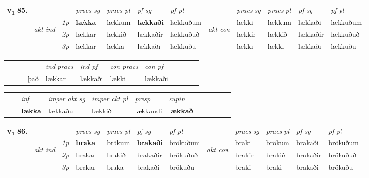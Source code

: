 \begin{tabular}{llllllllllll} \toprule
\multirow{4}{*}{{{\textbf{v{\textsubscript{1}}} \Large{\textbf{85.}}}}}  & &   &  \textit{praes sg}  & \textit{praes pl}  &\textit{ pf sg} & \textit{pf pl} &  &  \textit{praes sg}  & \textit{praes pl}  & \textit{pf sg} & \textit{pf pl } \\*
	\cmidrule{4-7} \cmidrule{9-12}
 & \multirow{3}{*}{\begin{turn}{90}\textit{akt ind}\end{turn}} & {\textit{1p}} & \textbf{lækka} & lækkum    & \textbf{lækkaði} & lækkuðum & \multirow{3}{*}{\begin{turn}{90}\textit{akt con}\end{turn}} &lækki & lækkum & lækkaði & lækkuðum\\*
& &  {\textit{2p}} &  lækkar  & lækkið   & lækkaðir & lækkuðuð & & lækkir & lækkið & lækkaðir & lækkuðuð \\*
& &  {\textit{3p}} & lækkar & lækka   & lækkaði & lækkuðu & & lækki & lækki& lækkaði & lækkuðu  \\*
\cmidrule{4-7} \cmidrule{9-12}
\end{tabular}


\begin{tabular}{llllllllllll}
 & &  & &  \textit{ind praes} & \textit{ind pf} & \textit{con praes} & \textit{con pf} \\*
&  & & það & lækkar & lækkaði & lækki & lækkaði \\*
\cmidrule{5-9}
\end{tabular}


\begin{tabular}{llllllllllll}
 & & \textit{inf} & \textit{imper akt sg} & \textit{imper akt pl}   & \textit{presp} & \textit{supin}       \\*
  & & \textbf{lækka} & lækkaðu  & lækkið   & lækkandi &  \textbf{lækkað}   \\*
\cmidrule{1-12}
\end{tabular}



\begin{tabular}{llllllllllll} \toprule
\multirow{4}{*}{{{\textbf{v{\textsubscript{1}}} \Large{\textbf{86.}}}}}  & &   &  \textit{praes sg}  & \textit{praes pl}  &\textit{ pf sg} & \textit{pf pl} &  &  \textit{praes sg}  & \textit{praes pl}  & \textit{pf sg} & \textit{pf pl } \\*
	\cmidrule{4-7} \cmidrule{9-12}
 & \multirow{3}{*}{\begin{turn}{90}\textit{akt ind}\end{turn}} & {\textit{1p}} & \textbf{braka} & brökum    & \textbf{brakaði} & brökuðum & \multirow{3}{*}{\begin{turn}{90}\textit{akt con}\end{turn}} &braki & brökum & brakaði & brökuðum\\*
& &  {\textit{2p}} &  brakar  & brakið   & brakaðir & brökuðuð & & brakir & brakið & brakaðir & brökuðuð \\*
& &  {\textit{3p}} & brakar & braka   & brakaði & brökuðu & & braki & braki& brakaði & brökuðu  \\*
\cmidrule{4-7} \cmidrule{9-12}
\end{tabular}


